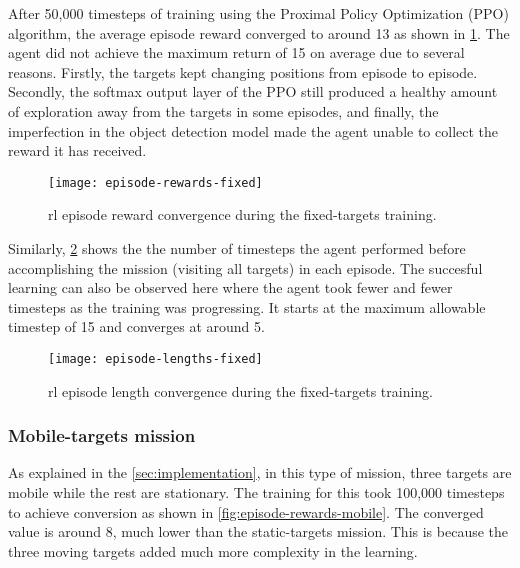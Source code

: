 \documentclass[../main.tex]{subfiles}
\begin{document}
After 50,000 timesteps of training using the Proximal Policy
Optimization (PPO) algorithm, the average episode reward converged
to around 13 as shown in \cref{fig:episode-rewards-fixed}.
The agent did not achieve the maximum return of 15
on average
due to several reasons. Firstly, the
targets kept changing positions from episode to episode.
Secondly, the softmax output layer of the PPO still produced 
a healthy amount
of exploration away from the targets in some episodes,
and finally, the imperfection in the object detection model made
the agent unable to collect the reward it has received. 

\begin{figure}[!t]
	\centering
	\texttt{[image: episode-rewards-fixed]}
        \caption{\gls{rl} episode reward convergence during the
        fixed-targets training.}
        \label{fig:episode-rewards-fixed}
\end{figure}

Similarly, \cref{fig:episode-lengths-fixed} shows the the number of
timesteps the agent performed before accomplishing the mission
(visiting all targets) in each episode.
The succesful learning can also be observed here where the agent took
fewer and fewer timesteps as the training was progressing.
It starts at the maximum allowable timestep of 15 and converges at
around 5.

\begin{figure}[!t]
	\centering
	\texttt{[image: episode-lengths-fixed]}
        \caption{\gls{rl} episode length convergence during the
        fixed-targets training.}
        \label{fig:episode-lengths-fixed}
\end{figure}

\subsubsection{Mobile-targets mission}

As explained in the \cref{sec:implementation}, in this type of
mission, three targets are mobile while the rest are stationary.
The training for this took 100,000 timesteps to achieve conversion as
shown in \cref{fig:episode-rewards-mobile}.
The converged value is around 8, much lower than the static-targets
mission.
This is because the three moving targets added much more complexity in the
learning.
\end{document}
